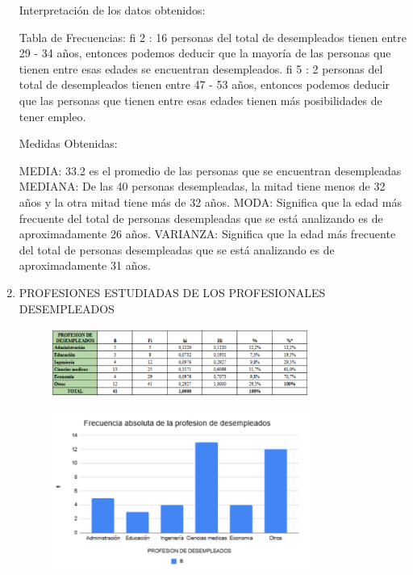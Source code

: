 \documentclass[12pt, a4paper]{article}
\begin{document}
\begin{enumerate}
    Interpretación de los datos obtenidos:

Tabla de Frecuencias:
fi 2 : 16 personas del total de desempleados tienen entre 29 - 34 años, entonces podemos deducir que la mayoría de las personas que tienen entre esas edades se encuentran desempleados.
fi 5 : 2 personas del total de desempleados tienen entre 47 - 53 años, entonces podemos deducir que las personas que tienen entre esas edades tienen más posibilidades de tener empleo.

Medidas Obtenidas:

MEDIA: 33.2 es el promedio de las personas que se encuentran desempleadas 
MEDIANA: De las 40 personas desempleadas, la mitad tiene menos de 32 años y la otra mitad tiene más de 32 años.
MODA: Significa que la edad más frecuente del total de personas desempleadas que se está analizando es de aproximadamente 26 años.  
VARIANZA: Significa que la edad más frecuente del total de personas desempleadas que se está analizando es de aproximadamente 31 años.  
    \item PROFESIONES ESTUDIADAS DE LOS PROFESIONALES DESEMPLEADOS
    \begin{figure}[H]
        \begin{center}
            \includegraphics[width=0.80\textwidth]{images/fram.png}
        \end{center}
        \label{fig:fram}
    \end{figure}
    \begin{figure}[H]
        \begin{center}
            \includegraphics[width=0.80\textwidth]{images/fram2.png}

\end{center}
\end{figure}
\end{enumerate}
\end{document}
